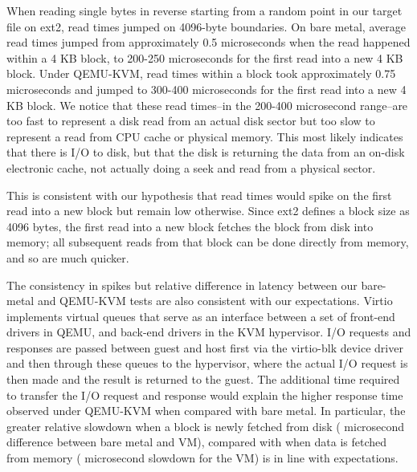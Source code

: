 \documentclass[letterpaper,twocolumn,10pt]{article}
\begin{document}
When reading single bytes in reverse starting from a random point in our target file on ext2, read times jumped on 4096-byte boundaries. On bare metal, average read times jumped from approximately 0.5 microseconds when the read happened within a 4 KB block, to 200-250 microseconds for the first read into a new 4 KB block. Under QEMU-KVM, read times within a block took approximately 0.75 microseconds and jumped to 300-400 microseconds for the first read into a new 4 KB block. We notice that these read times--in the 200-400 microsecond range--are too fast to represent a disk read from an actual disk sector but too slow to represent a read from CPU cache or physical memory. This most likely indicates that there is I/O to disk, but that the disk is returning the data from an on-disk electronic cache, not actually doing a seek and read from a physical sector.

This is consistent with our hypothesis that read times would spike on the first read into a new block but remain low otherwise. 
Since ext2 defines a block size as 4096 bytes, the first read into a new block fetches the block from disk into memory; all subsequent reads from that block can be done directly from memory, and so are much quicker.

The consistency in spikes but relative difference in latency between our bare-metal and QEMU-KVM tests are also consistent with our expectations. 
Virtio implements virtual queues that serve as an interface between a set of front-end drivers in QEMU, and back-end drivers in the KVM hypervisor. 
I/O requests and responses are passed between guest and host first via the virtio-blk device driver and then through these queues to the hypervisor, where the actual I/O request is then made and the result is returned to the guest. 
The additional time required to transfer the I/O request and response would explain the higher response time observed under QEMU-KVM when compared with bare metal. 
In particular, the greater relative slowdown when a block is newly fetched from disk ( microsecond difference between bare metal and VM), compared with when data is fetched from memory ( microsecond slowdown for the VM) is in line with expectations. 
\end{document}
